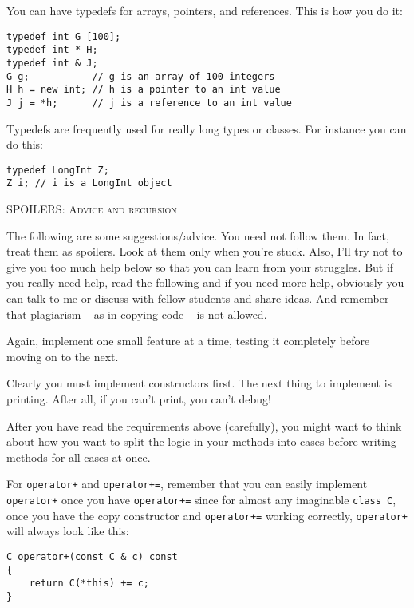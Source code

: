 You can have typedefs for arrays, pointers, and references. 
This is how you do it:
\begin{Verbatim}[frame=single,fontsize=\footnotesize]
typedef int G [100];
typedef int * H;
typedef int & J;
G g;           // g is an array of 100 integers
H h = new int; // h is a pointer to an int value
J j = *h;      // j is a reference to an int value
\end{Verbatim}

Typedefs are frequently used for really long types or classes. 
For instance you can do this:

\begin{Verbatim}[frame=single,fontsize=\footnotesize]
typedef LongInt Z;
Z i; // i is a LongInt object
\end{Verbatim}


\newpage
\textsc{SPOILERS: Advice and recursion}

The following are some suggestions/advice. You need not follow 
them. In fact, treat them as spoilers. Look at them only when 
you're stuck. Also, I'll try not to give you too much help below 
so that you can learn from your struggles. But if you really need 
help, read the following and if you need more help, obviously you 
can talk to me or discuss with fellow students and share ideas. 
And remember that plagiarism – as in copying code – is not allowed. 

Again, implement one small feature at a time, testing it completely 
before moving on to the next.

Clearly you must implement constructors first. The next thing to 
implement is printing. After all, if you can't print, you can't debug!

After you have read the requirements above (carefully), 
you might want to think about how you want to split the logic in your methods
into cases before writing methods for all cases at once.


For \verb!operator+! and \verb!operator+=!, remember that you can easily 
implement \verb!operator+! once you have \verb!operator+=! since for 
almost any imaginable \verb!class C!, once you have the copy constructor 
and \verb!operator+=! working correctly, \verb!operator+! will always 
look like this:

\begin{Verbatim}[frame=single,fontsize=\footnotesize]
C operator+(const C & c) const
{
    return C(*this) += c;
}
\end{Verbatim}

